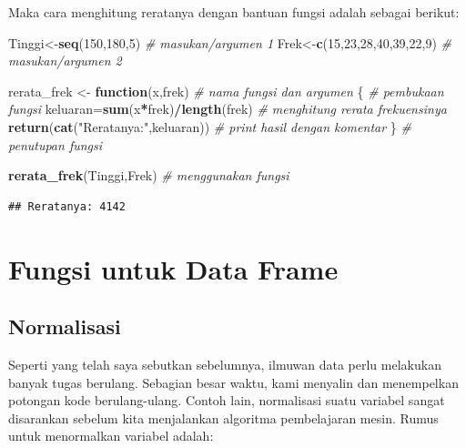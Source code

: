 \documentclass[
]{book}
\newenvironment{Shaded}{\begin{snugshade}}{\end{snugshade}}
\newcommand{\CommentTok}[1]{\textcolor[rgb]{0.56,0.35,0.01}{\textit{#1}}}
\newcommand{\ControlFlowTok}[1]{\textcolor[rgb]{0.13,0.29,0.53}{\textbf{#1}}}
\newcommand{\DecValTok}[1]{\textcolor[rgb]{0.00,0.00,0.81}{#1}}
\newcommand{\FunctionTok}[1]{\textcolor[rgb]{0.13,0.29,0.53}{\textbf{#1}}}
\newcommand{\NormalTok}[1]{#1}
\newcommand{\OtherTok}[1]{\textcolor[rgb]{0.56,0.35,0.01}{#1}}
\newcommand{\SpecialCharTok}[1]{\textcolor[rgb]{0.81,0.36,0.00}{\textbf{#1}}}
\newcommand{\StringTok}[1]{\textcolor[rgb]{0.31,0.60,0.02}{#1}}
\begin{document}
Maka cara menghitung reratanya dengan bantuan fungsi adalah sebagai berikut:

\begin{Shaded}
\begin{Highlighting}[]
\NormalTok{Tinggi}\OtherTok{\textless{}{-}}\FunctionTok{seq}\NormalTok{(}\DecValTok{150}\NormalTok{,}\DecValTok{180}\NormalTok{,}\DecValTok{5}\NormalTok{)                       }\CommentTok{\# masukan/argumen 1 }
\NormalTok{Frek}\OtherTok{\textless{}{-}}\FunctionTok{c}\NormalTok{(}\DecValTok{15}\NormalTok{,}\DecValTok{23}\NormalTok{,}\DecValTok{28}\NormalTok{,}\DecValTok{40}\NormalTok{,}\DecValTok{39}\NormalTok{,}\DecValTok{22}\NormalTok{,}\DecValTok{9}\NormalTok{)                 }\CommentTok{\# masukan/argumen 2}

\NormalTok{rerata\_frek }\OtherTok{\textless{}{-}} \ControlFlowTok{function}\NormalTok{(x,frek)              }\CommentTok{\# nama fungsi dan argumen}
\NormalTok{\{                                            }\CommentTok{\# pembukaan fungsi}
\NormalTok{ keluaran}\OtherTok{=}\FunctionTok{sum}\NormalTok{(x}\SpecialCharTok{*}\NormalTok{frek)}\SpecialCharTok{/}\FunctionTok{length}\NormalTok{(frek)           }\CommentTok{\# menghitung rerata frekuensinya}
 \FunctionTok{return}\NormalTok{(}\FunctionTok{cat}\NormalTok{(}\StringTok{"Reratanya:"}\NormalTok{,keluaran))          }\CommentTok{\# print hasil dengan komentar }
\NormalTok{\}                                            }\CommentTok{\# penutupan fungsi}

\FunctionTok{rerata\_frek}\NormalTok{(Tinggi,Frek)                     }\CommentTok{\# menggunakan fungsi}
\end{Highlighting}
\end{Shaded}

\begin{verbatim}
## Reratanya: 4142
\end{verbatim}

\hypertarget{fungsi-untuk-data-frame}{%
\section{Fungsi untuk Data Frame}\label{fungsi-untuk-data-frame}}

\hypertarget{normalisasi}{%
\subsection{Normalisasi}\label{normalisasi}}

Seperti yang telah saya sebutkan sebelumnya, ilmuwan data perlu melakukan banyak tugas berulang. Sebagian besar waktu, kami menyalin dan menempelkan potongan kode berulang-ulang. Contoh lain, normalisasi suatu variabel sangat disarankan sebelum kita menjalankan algoritma pembelajaran mesin. Rumus untuk menormalkan variabel adalah:
\end{document}
